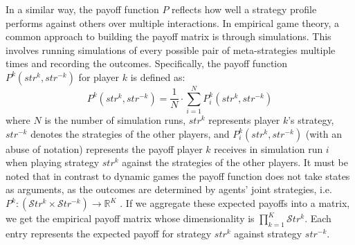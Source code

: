 \begin{flushleft}
    In a similar way, the payoff function $P$ reflects how well a strategy profile performs against others over multiple interactions. In empirical game theory, a common approach to building the payoff matrix is through simulations. This involves running simulations of every possible pair of meta-strategies multiple times and recording the outcomes. Specifically, the payoff function $P^k(str^k, str^{-k})$ for player $k$ is defined as:
    \begin{equation}
        P^k(str^k, str^{-k}) =\frac{1}{N} \cdot \sum_{i=1}^{N} P^k_{i}(str^k, str^{-k})
        \label{eq:meta_payoff}
    \end{equation}
    where $N$ is the number of simulation runs, $str^k$ represents player $k$'s strategy, $str^{-k}$ denotes the strategies of the other players, and $P^k_{i}(str^k, str^{-k})$ (with an abuse of notation) represents the payoff player $k$ receives in simulation run $i$ when playing strategy $str^k$ against the strategies of the other players. It must be noted that in contrast to dynamic games the payoff function does not take states as arguments, as the outcomes are determined by agents' joint strategies, i.e. $P^k: (\mathcal{S}tr^k \times \mathcal{S}tr^{-k}) \to \mathbb{R}^K$ \cite{omidshafiei2019alpharank}. If we aggregate these expected payoffs into a matrix, we get the empirical payoff matrix whose dimensionality is $\prod_{k=1}^K\mathcal{S}tr^k$. Each entry represents the expected payoff for strategy $str^k$ against strategy $str^{-k}$.

\end{flushleft}